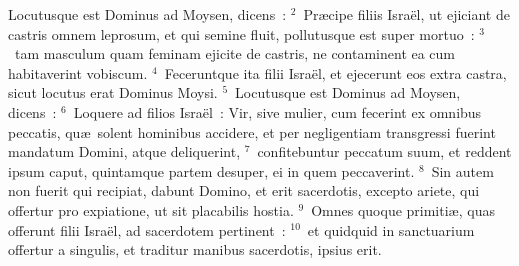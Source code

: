 \lettrine[lines=3,image=true,loversize=0.05,lraise=-0.03]{L}{}ocutusque est Dominus ad Moysen, dicens~:
${}^{2}$~Pr\ae cipe filiis Isra\"el, ut ejiciant de castris omnem leprosum, et qui semine fluit, pollutusque est super mortuo~:
${}^{3}$~tam masculum quam feminam ejicite de castris, ne contaminent ea cum habitaverint vobiscum.
${}^{4}$~Feceruntque ita filii Isra\"el, et ejecerunt eos extra castra, sicut locutus erat Dominus Moysi.
${}^{5}$~Locutusque est Dominus ad Moysen, dicens~:
${}^{6}$~Loquere ad filios Isra\"el~: Vir, sive mulier, cum fecerint ex omnibus peccatis, qu\ae\ solent hominibus accidere, et per negligentiam transgressi fuerint mandatum Domini, atque deliquerint,
${}^{7}$~confitebuntur peccatum suum, et reddent ipsum caput, quintamque partem desuper, ei in quem peccaverint.
${}^{8}$~Sin autem non fuerit qui recipiat, dabunt Domino, et erit sacerdotis, excepto ariete, qui offertur pro expiatione, ut sit placabilis hostia.
${}^{9}$~Omnes quoque primiti\ae , quas offerunt filii Isra\"el, ad sacerdotem pertinent~:
${}^{10}$~et quidquid in sanctuarium offertur a singulis, et traditur manibus sacerdotis, ipsius erit.



